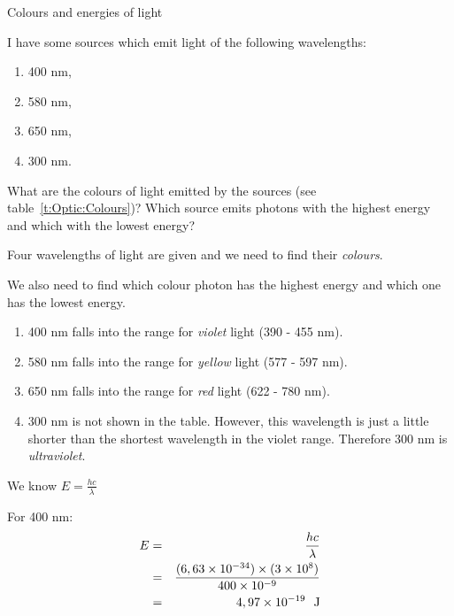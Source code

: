 \begin{wex}{Colours and energies of light}
{I have some sources which emit light of the following wavelengths:
\begin{enumerate} 
\item 400 nm, 
\item 580 nm, 
\item 650 nm,
\item 300 nm.
\end{enumerate}
What are the colours of light emitted by the sources (see table~\ref{t:Optic:Colours})? Which source emits photons with the highest energy and which with the lowest energy?
}
{
Four wavelengths of light are given and we need to find their \textit{colours}. 

We also need to find which colour photon has the highest energy and which one has the lowest energy.

\begin{enumerate}
 \item 400 nm falls into the range for \textit{violet} light (390 - 455 nm).
 \item 580 nm falls into the range for \textit{yellow} light (577 - 597 nm).
 \item 650 nm falls into the range for \textit{red} light (622 - 780 nm).
 \item 300 nm is not shown in the table. However, this wavelength is just a little shorter than the shortest wavelength in the violet range. Therefore 300 nm is \textit{ultraviolet}.
\end{enumerate}


We know $E = \frac{hc}{\lambda}$

\begin{minipage}{0.3\textwidth}
For 400 nm:
\begin{eqnarray*}
E & = & \frac{hc}{\lambda} \\
  & = & \frac{(6,63 \times 10^{-34}) \times (3 \times 10^{8}) }{400 \times 10^{-9}} \\
  & = &  4,97 \times 10^{-19}~~\rm{J}
\end{eqnarray*}
\end{minipage}

}
\end{wex}
